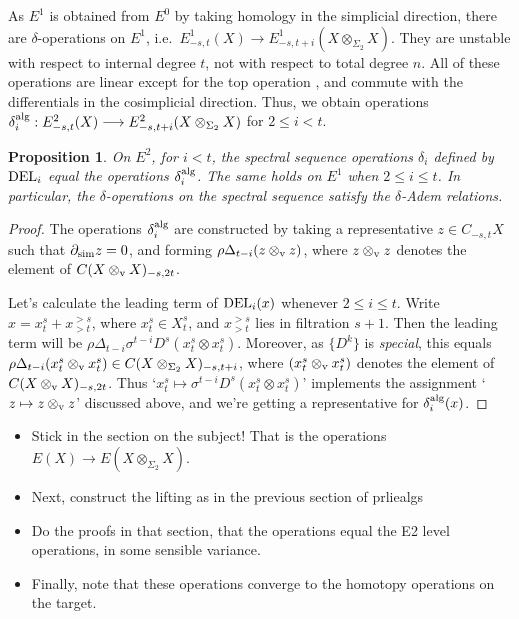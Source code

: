\documentclass[11pt]{amsart}
\theoremstyle{plain}
\newtheorem{prop}[thm]{Proposition}
\theoremstyle{definition}
\renewcommand{\to}{\longrightarrow}
\newcommand{\squishlist}{
  \setlength{\itemsep}{.5pt}
  \setlength{\parskip}{0pt}
  \setlength{\parsep}{0pt}}
\newcommand{\twist}{\sigma}
\theoremstyle{plain}
\begin{document}
As $E^1$ is obtained from $E^0$ by taking homology in the simplicial direction, there are $\delta$-operations on $E^1$, i.e.\ $E^1_{-s,t}(X)\to E^1_{-s,t+i}(X\otimes_{\Sigma_2}X)$. They are unstable with respect to internal degree $t$, not with respect to total degree $n$. All of these operations are linear except for the top operation \cite[4.2]{DwyerHtpyOpsSimpComAlg.pdf}, and commute with the differentials in the cosimplicial direction. Thus, we obtain operations $\delta_i^\textup{alg}:E^2_{-s,t}(X)\to E^2_{-s,t+i}(X\otimes_{\Sigma_2}X)$ for $2\leq i<t$.
\begin{prop}
On $E^2$, for $i<t$, the spectral sequence operations $\delta_i$ defined by $\textup{DEL}_i$ equal the operations $\delta_i^\textup{alg}$. The same holds on $E^1$ when $2\leq i\leq t$. In particular, the $\delta$-operations on the spectral sequence satisfy the $\delta$-Adem relations.
\end{prop}
\begin{proof}
The operations $\delta_i^\textup{alg}$ are constructed by taking a representative $z\in C_{-s,t}X$ such that $\partial_\textup{sim}z=0$, and forming $\rho\Delta_{t-i}(z\otimes_\textup{v} z)$, where $z\otimes_\textup{v} z$ denotes the element of $C(X\otimes_\textup{v}X)_{-s,2t}$.

Let's calculate the leading term of $\textup{DEL}_{i}(x)$ whenever $2\leq i\leq t$. Write $x=x^s_t+x^{>s}_{>t}$, where $x^s_t\in X^s_t$, and $x^{>s}_{>t}$ lies in filtration $s+1$. Then the leading term will be $\rho\Delta_{t-i}\twist^{t-i}D^s (x^s_t\otimes x^s_t)$. Moreover, as $\{D^k\}$ is \emph{special}, this equals $\rho{\Delta}_{t-i}(x^s_t\otimes_\textup{v} x^s_t)\in C(X\otimes_{\Sigma_2} X)_{-s,t+i}$, where $(x^s_t\otimes_\textup{v} x^s_t)$ denotes the element of $C(X\otimes_\textup{v}X)_{-s,2t}$. Thus `$x^s_t\mapsto \twist^{t-i}D^s(x^s_t\otimes x^s_t)$' implements the assignment `$z\mapsto z\otimes_\textup{v} z$' discussed above, and we're getting a representative for $\delta_i^\textup{alg}(x)$.
\end{proof}


{\tiny\begin{itemize}\squishlist
\setlength{\parindent}{.25in}
\item Stick in the section on the subject! That is the operations $E(X)\to E(X\otimes_{\Sigma_2}X)$.
\item Next, construct the lifting as in the previous section of prliealgs
\item Do the proofs in that section, that the operations equal the E2 level operations, in some sensible variance.
\item Finally, note that these operations converge to the homotopy operations on the target.
\end{itemize}}
\end{document}

